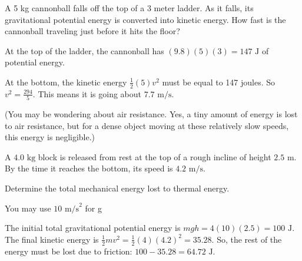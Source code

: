 \begin{Exercise}[title={The Energy of Falling}, label=energy_falling]

A 5 kg cannonball falls off the top of a 3 meter ladder. As it falls, its 
gravitational potential energy is converted into kinetic energy. How fast is 
the cannonball traveling just before it hits the floor?

\end{Exercise}
\begin{Answer}[ref=energy_falling]

  At the top of the ladder, the cannonball has $(9.8)(5)(3) = 147 \text{ J}$ of potential energy.

  At the bottom, the kinetic energy $\frac{1}{2}(5)v^2$ must be equal
  to 147 joules. So $v^2 = \frac{294}{5}$.  This means it is going about
  $7.7 \text{ m/s}$.

  (You may be wondering about air resistance. Yes, a tiny amount of energy is 
  lost to air resistance, but for a dense object moving at these relatively slow 
  speeds, this energy is negligible.)

\end{Answer}

\begin{Exercise}[title=Frictional Losses, label =slidingblockfriction]
  A $4.0 \text{ kg}$ block is released from rest at the top of a rough incline of height $2.5 \text{ m}$.
  By the time it reaches the bottom, its speed is $4.2 \text{ m/s}$. 

  Determine the total mechanical energy lost to thermal energy.

  You may use $10 \text{ m/s}^2$ for g
\end{Exercise}
\begin{Answer}[ref=slidingblockfriction]
The initial total gravitational potential energy is $mgh = 4(10)(2.5) = 100 \text{ J}$. The final kinetic energy is $\frac{1}{2} mv^2 = \frac{1}{2}(4)(4.2)^2 = 35.28$. So, the rest of the energy must be lost due to friction: $100 - 35.28 = 64.72 \text{ J}$. 
\end{Answer}

